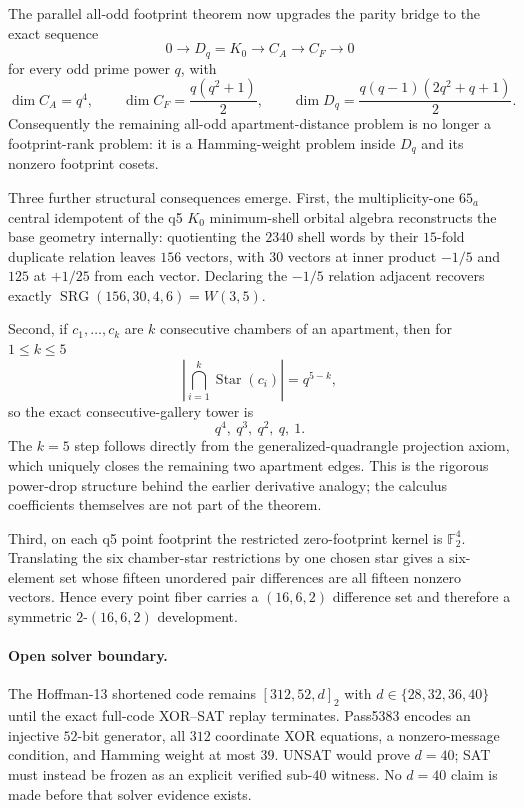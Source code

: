 The parallel all-odd footprint theorem now upgrades the parity bridge to the exact sequence
\[
0\longrightarrow D_q=K_0\longrightarrow C_A\longrightarrow C_F\longrightarrow0
\]
for every odd prime power $q$, with
\[
\dim C_A=q^4,\qquad
\dim C_F=\frac{q(q^2+1)}2,\qquad
\dim D_q=\frac{q(q-1)(2q^2+q+1)}2.
\]
Consequently the remaining all-odd apartment-distance problem is no longer a footprint-rank problem: it is a Hamming-weight problem inside $D_q$ and its nonzero footprint cosets.

Three further structural consequences emerge.  First, the multiplicity-one $65_a$ central idempotent of the q5 $K_0$ minimum-shell orbital algebra reconstructs the base geometry internally: quotienting the $2340$ shell words by their $15$-fold duplicate relation leaves $156$ vectors, with $30$ vectors at inner product $-1/5$ and $125$ at $+1/25$ from each vector.  Declaring the $-1/5$ relation adjacent recovers exactly $\operatorname{SRG}(156,30,4,6)=W(3,5)$.

Second, if $c_1,\ldots,c_k$ are $k$ consecutive chambers of an apartment, then for $1\le k\le5$
\[
\left|\bigcap_{i=1}^k \operatorname{Star}(c_i)\right|=q^{5-k},
\]
so the exact consecutive-gallery tower is
\[
q^4,\ q^3,\ q^2,\ q,\ 1.
\]
The $k=5$ step follows directly from the generalized-quadrangle projection axiom, which uniquely closes the remaining two apartment edges.  This is the rigorous power-drop structure behind the earlier derivative analogy; the calculus coefficients themselves are not part of the theorem.

Third, on each q5 point footprint the restricted zero-footprint kernel is $\mathbb F_2^4$.  Translating the six chamber-star restrictions by one chosen star gives a six-element set whose fifteen unordered pair differences are all fifteen nonzero vectors.  Hence every point fiber carries a $(16,6,2)$ difference set and therefore a symmetric $2$-$(16,6,2)$ development.

\paragraph{Open solver boundary.}
The Hoffman-13 shortened code remains $[312,52,d]_2$ with $d\in\{28,32,36,40\}$ until the exact full-code XOR--SAT replay terminates.  Pass5383 encodes an injective $52$-bit generator, all $312$ coordinate XOR equations, a nonzero-message condition, and Hamming weight at most $39$.  UNSAT would prove $d=40$; SAT must instead be frozen as an explicit verified sub-$40$ witness.  No $d=40$ claim is made before that solver evidence exists.
